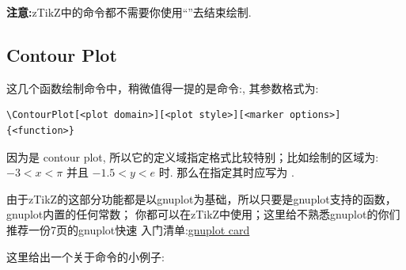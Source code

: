 \begin{center}
\end{center}

\begin{leftbar}
\noindent \textbf{注意:}zTikZ中的命令都不需要你使用``\cmd{;}''去结束绘制.
\end{leftbar}


\subsection{Contour Plot}
这几个函数绘制命令中，稍微值得一提的是命令:\cmd{\ContourPlot}\index{\cmd{\ContourPlot}}, 其参数格式为:

\begin{verbatim}
\ContourPlot[<plot domain>][<plot style>][<marker options>]{<function>}
\end{verbatim}

因为是 contour plot, 所以它的定义域指定格式比较特别；比如绘制的区域为:
$-3<x<\pi$ 并且 $-1.5<y<e$ 时. 那么在指定其时应写为
.

\begin{leftbar}
\noindent 由于zTikZ的这部分功能都是以gnuplot为基础，所以只要是gnuplot支持的函数，gnuplot内置的任何常数；
你都可以在zTikZ中使用；这里给不熟悉gnuplot的你们推荐一份7页的gnuplot快速
入门清单:\href{http://www.gnuplot.info/docs_4.0/gpcard.pdf}{gnuplot card}
\end{leftbar}

这里给出一个关于\cmd{\ContourPlot}命令的小例子:

\begin{center}
\end{center}

